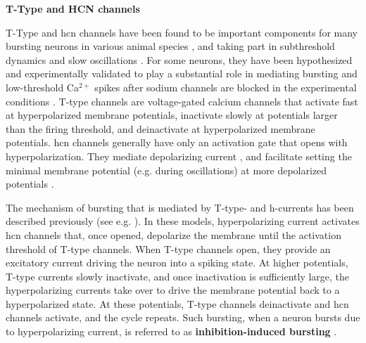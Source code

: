 \documentclass[../main.tex]{subfiles}
\begin{document}
\noindent\textbf{T-Type and HCN channels}

T-Type and \gls{hcn} channels have been found to be important components for many bursting neurons in various animal species \parencite{amarilloInterplaySevenSubthreshold2014,vickstromTTypeCalciumChannels2020,destexheModelInwardCurrent1993},
and taking part in subthreshold dynamics and slow oscillations \parencite{wangMultipleDynamicalModes1994}.
For some neurons, they have been hypothesized and experimentally validated to play a substantial role in mediating bursting and low-threshold Ca$^{2+}$ spikes after sodium channels are blocked in the experimental conditions \cite{mccormickModelElectrophysiologicalProperties1992,liuMultipleConductancesCooperatively2008,vickstromTTypeCalciumChannels2020,suzukiTtypeCalciumChannels1989}.
T-type channels are voltage-gated calcium channels that activate fast at hyperpolarized membrane potentials, inactivate slowly at potentials larger than the firing threshold, and deinactivate at hyperpolarized membrane potentials. \gls{hcn} channels generally have only an activation gate that opens with hyperpolarization. They mediate depolarizing current \parencite{destexheModelInwardCurrent1993}, and facilitate setting the minimal membrane potential (e.g. during oscillations) at more depolarized potentials \parencite{liuMultipleConductancesCooperatively2008}.

The mechanism of bursting that is mediated by T-type- and h-currents has been described previously (see e.g. \parencite{liuMultipleConductancesCooperatively2008,wangMultipleDynamicalModes1994}). In these models, hyperpolarizing current activates \gls{hcn} channels that, once opened, depolarize the membrane until the activation threshold of T-type channels. When T-type channels open, they provide an excitatory current driving the neuron into a spiking state.
At higher potentials, T-type currents slowly inactivate, and once inactivation is sufficiently large, the hyperpolarizing currents take over to drive the membrane potential back to a hyperpolarized state.
At these potentials, T-type channels deinactivate and \gls{hcn} channels activate, and the cycle repeats. Such bursting, when a neuron bursts due to hyperpolarizing current, is referred to as \textbf{inhibition-induced bursting} \parencite{izhikevichDynamicalSystemsNeuroscience2006}.
\end{document}
